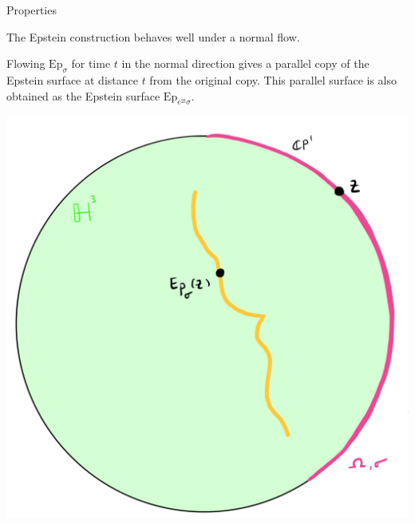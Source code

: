 \documentclass[professionalfont]{beamer}
\begin{document}
\begin{frame}{Properties}

The Epstein construction behaves well under a normal flow. 

Flowing $\mathrm{Ep}_\sigma$ for time $t$ in the normal direction gives a parallel copy of the Epstein surface at distance $t$ from the original copy. This parallel surface is also obtained as the Epstein surface $\mathrm{Ep}_{e^{2t}\sigma}$.

\centering\includegraphics[scale=0.09]{Parallel-4.jpg}

\end{frame}


\end{document}
